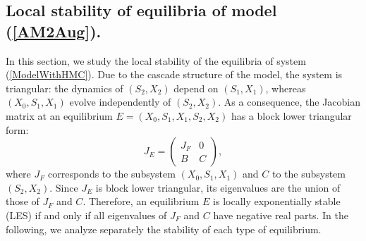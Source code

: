 \documentclass[runningheads]{llncs}
\begin{document}
\subsection{Local stability of equilibria of model (\ref{AM2Aug}).} \label{SecAppLES}
In this section, we study the local stability of the equilibria of system (\ref{ModelWithHMC}). 
Due to the cascade structure of the model, the system is triangular: 
the dynamics of $(S_2,X_2)$ depend on $(S_1,X_1)$, whereas 
$(X_0,S_1,X_1)$ evolve independently of $(S_2,X_2)$. 
As a consequence, the Jacobian matrix at an equilibrium 
$E=(X_0,S_1,X_1,S_2,X_2)$ has a block lower triangular form:
\[
J_E =
\begin{pmatrix}
J_F & 0 \\
B   & C
\end{pmatrix},
\]
where $J_F$ corresponds to the subsystem $(X_0,S_1,X_1)$ 
and $C$ to the subsystem $(S_2,X_2)$. 
Since $J_E$ is block lower triangular, its eigenvalues are the union of 
those of $J_F$ and $C$. 
Therefore, an equilibrium $E$ is locally exponentially stable (LES) 
if and only if all eigenvalues of $J_F$ and $C$ have negative real parts. 
In the following, we analyze separately the stability of each type of equilibrium.
\end{document}
